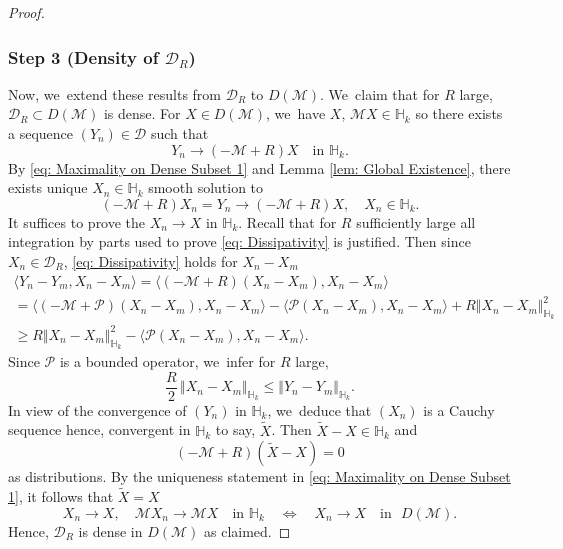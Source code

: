 \documentclass[JEP,XML,SOM,Unicode]{cedram}
\theoremstyle{plain}
\theoremstyle{definition}
\begin{document}
\begin{proof}
\subsubsection*{Step 3 (Density of $\mathcal D_R$)}
Now, we~extend these results from $\mathcal D_R$ to $D(\mathcal M)$. We~claim that for $R$ large, $\mathcal D_R\subset D(\mathcal M)$ is dense. For $X\in D(\mathcal M)$, we~have $X$, $\mathcal MX\in\mathbb H_k$ so there exists a sequence $(Y_n)\in \mathcal D$ such that
\[
Y_n\to (-\mathcal M+R)X\quad\text{in }\mathbb H_k.
\]
By \eqref{eq: Maximality on Dense Subset 1} and Lemma \ref{lem: Global Existence}, there exists unique $X_n\in\mathbb H_k$ smooth solution to
\[
(-\mathcal M+R)X_n=Y_n\to (-\mathcal M+R)X,\quad X_n\in \mathbb H_k.
\]
It suffices to prove the $X_n\to X$ in $\mathbb H_k$. Recall that for $R$ sufficiently large all integration by parts used to prove \eqref{eq: Dissipativity} is justified. Then since $X_n\in \mathcal D_R$, \eqref{eq: Dissipativity} holds for $X_n-X_m$ \ie\vspace*{-5pt}
\begin{multline*}
\langle Y_n-Y_m, X_n-X_m\rangle = \langle (-\mathcal M+R)(X_n-X_m), X_n-X_m\rangle \\
= \langle (-\mathcal M+\mathcal P)(X_n-X_m), X_n-X_m\rangle - \langle \mathcal P(X_n-X_m), X_n-X_m\rangle +R\Vert X_n-X_m\Vert _{\mathbb H_k}^2\\
\ge R\Vert X_n-X_m\Vert _{\mathbb H_k}^2 - \langle \mathcal P(X_n-X_m), X_n-X_m\rangle.
\end{multline*}
Since $\mathcal P$ is a bounded operator, we~infer for $R$ large,\vspace*{-3pt}
\[
\frac{R}{2}\,\Vert X_n-X_m\Vert_{\mathbb H_k}\le \Vert Y_n-Y_m\Vert_{\mathbb H_k}.
\]
In view of the convergence of $(Y_n)$ in $\mathbb H_k$, we~deduce that $(X_n)$ is a Cauchy sequence hence, convergent in $\mathbb H_k$ to say, $\tilde X$. Then $\tilde X-X\in\mathbb H_k$ and\vspace*{-3pt}
\[
(-\mathcal M+R)(\tilde X-X)=0
\]
as distributions. By the uniqueness statement in \eqref{eq: Maximality on Dense Subset 1}, it follows that $\tilde X=X$ \ie
\[
X_n\to X,\quad \mathcal MX_n\to\mathcal MX \quad\text{in }\mathbb H_k\quad \iff \quad X_n\to X\quad\text{in }\,\,D(\mathcal M).
\]
Hence, $\mathcal D_R$ is dense in $D(\mathcal M)$ as claimed.


\end{proof}
\end{document}

